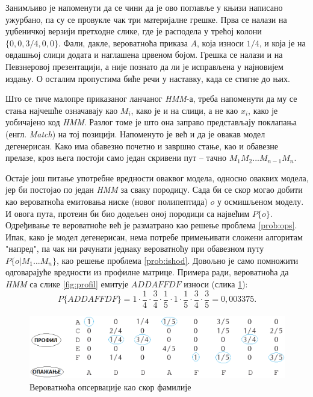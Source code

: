 \documentclass[12pt,oneside]{memoir}
\begin{document}
\begin{CJK}{UTF8}{ipxm}
Занимљиво је напоменути да се чини да је ово поглавље у књизи написано ужурбано, па су се провукле чак три материјалне грешке. Прва се налази на уџбеничкој верзији претходне слике, где је расподела у трећој колони $\{0, 0, 3/4, 0, 0\}$. Фали, дакле, вероватноћа приказа $A$, која износи $1/4$, и која је на овдашњој слици додата и наглашена црвеном бојом. Грешка се налази и на Певзнеровој презентацији, а није познато да ли је исправљена у најновијем издању. О осталим пропустима биће речи у наставку, када се стигне до њих.

Што се тиче малопре приказаног ланчаног \textit{HMM}-а, треба напоменути да му се стања најчешће означавају као $M_i$, како је и на слици, а не као $x_i$, како је уобичајено код \textit{HMM}. Разлог томе је што она заправо представљају поклапања (енгл. \textit{Match}) на тој позицији. Напоменуто је већ и да је овакав модел дегенерисан. Како има обавезно почетно и завршно стање, као и обавезне прелазе, кроз њега постоји само један скривени пут -- тачно $M_1M_2...M_{n-1}M_n$.

Остаје још питање употребне вредности оваквог модела, односно оваквих модела, јер би постојао по један \textit{HMM} за сваку породицу. Сада би се скор могао добити као вероватноћа емитовања ниске (новог полипептида) $o$ у осмишљеном моделу. И овога пута, протеин би био додељен оној породици са највећим $P\{o\}$. Одређивање те вероватноће већ је разматрано као решење проблема \ref{prob:ops}. Ипак, како је модел дегенерисан, нема потребе примењивати сложени алгоритам "напред", па чак ни рачунати једнаку вероватноћу при обавезном путу $P\{o | M_1...M_n\}$, као решење проблема \ref{prob:ishod}. Довољно је само помножити одговарајуће вредности из профилне матрице. Примера ради, вероватноћа да \textit{HMM} са слике \ref{fig:profil} емитује $ADDAFFDF$ износи (слика \ref{fig:prof_ishod}): $$P\{ADDAFFDF\} = 1 \cdot \frac{1}{4} \cdot \frac{3}{4} \cdot \frac{1}{5} \cdot 1 \cdot \frac{1}{5} \cdot \frac{3}{4} \cdot \frac{3}{5} = 0,003375.$$

\begin{figure}[H]
  \centering
  \includegraphics[width=\textwidth]{prof_ishod.png}
  \caption{Вероватноћа опсервације као скор фамилије\cite{compeau2015}}
  \label{fig:prof_ishod}
\end{figure}


\end{CJK}
\end{document}
